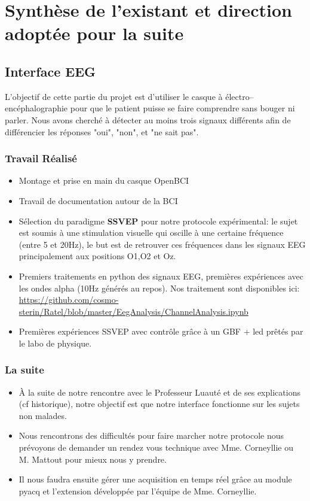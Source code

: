 \documentclass[12pt]{article}
\begin{document}
\section{Synthèse de l'existant et direction adoptée pour la suite}
\subsection{Interface EEG}
L'objectif de cette partie du projet est d'utiliser le casque à électro--encéphalographie pour que le patient puisse se faire comprendre sans bouger ni parler. Nous avons cherché à détecter au moins trois signaux différents afin de différencier les réponses "oui", "non", et "ne sait pas".
\subsubsection{Travail Réalisé}
\begin{itemize}
\item Montage et prise en main du casque OpenBCI \\
\item Travail de documentation autour de la BCI \\
\item Sélection du paradigme \textbf{SSVEP} pour notre protocole expérimental: le sujet est soumis à une stimulation visuelle qui oscille à une certaine fréquence (entre 5 et 20Hz), le but est de retrouver ces fréquences dans les signaux EEG principalement aux positions O1,O2 et Oz. \\
\item Premiers traitements en python des signaux EEG, premières expériences avec les ondes alpha (10Hz générés au repos). Nos traitement sont disponibles ici: \\ \url{https://github.com/cosmo-sterin/Ratel/blob/master/EegAnalysis/ChannelAnalysis.ipynb} \\
\item Premières expériences SSVEP avec contrôle grâce à un GBF + led prêtés par le labo de physique.
\end{itemize}
\subsubsection{La suite}
\begin{itemize}
\item À la suite de notre rencontre avec le Professeur Luauté et de ses explications (cf historique), notre objectif est que notre interface fonctionne sur les sujets non malades. \\
\item Nous rencontrons des difficultés pour faire marcher notre protocole nous prévoyons de demander un rendez vous technique avec Mme. Corneyllie ou M. Mattout pour mieux nous y prendre.\\
\item Il nous faudra ensuite gérer une acquisition en temps réel grâce au module pyacq et l'extension développée par l'équipe de Mme. Corneyllie.
\end{itemize}
\end{document}
